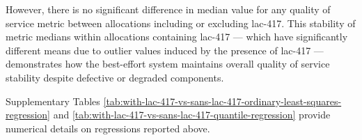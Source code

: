 However, there is no significant difference in median value for any quality of service metric between allocations including or excluding lac-417.
This stability of metric medians within allocations containing lac-417 --- which have significantly different means due to outlier values induced by the presence of lac-417 --- demonstrates how the best-effort system maintains overall quality of service stability despite defective or degraded components.

Supplementary Tables \ref{tab:with-lac-417-vs-sans-lac-417-ordinary-least-squares-regression} and \ref{tab:with-lac-417-vs-sans-lac-417-quantile-regression} provide numerical details on regressions reported above.
